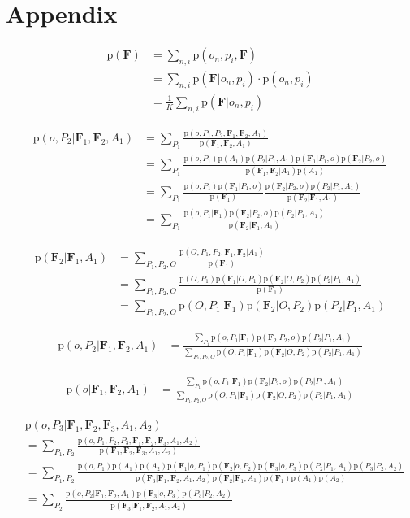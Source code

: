 \documentclass[11pt]{article}
\newcommand{\SetOf}[1]{\mathbf{#1}} %
\newcommand{\prob}[1]{\text{p}(#1)} %
\newcommand{\Eq}[1]{\begin{align*}#1\end{align*}} %
\begin{document}
	

\section{Appendix}
	\Eq{\prob{\SetOf{F}} &= \sum_{n,i} \prob{o_n,p_i,\SetOf{F}}\\
	&= \sum_{n,i} \prob{\SetOf{F}|o_n,p_i}\cdot \prob{o_n,p_i}\\
	&= \frac{1}{K} \sum_{n,i} \prob{\SetOf{F}|o_n,p_i}}

	\Eq{\prob{o,P_2|\SetOf{F}_1,\SetOf{F}_2,A_1} &= \sum_{P_1} \frac{\prob{o,P_1,P_2,\SetOf{F}_1,\SetOf{F}_2,A_1}}{\prob{\SetOf{F}_1,\SetOf{F}_2,A_1}} \\
	&= \sum_{P_1} \frac{\prob{o,P_1}\prob{A_1}\prob{P_2|P_1,A_1}\prob{\SetOf{F}_1|P_1,o} \prob{\SetOf{F}_2|P_2,o}}{\prob{\SetOf{F}_1,\SetOf{F}_2|A_1}\prob{A_1}} \\
	&= \sum_{P_1} \frac{\prob{o,P_1}\prob{\SetOf{F}_1|P_1,o}}{ \prob{\SetOf{F}_1}} \frac{\prob{\SetOf{F}_2|P_2,o}\prob{P_2|P_1,A_1}}{\prob{\SetOf{F}_2|\SetOf{F}_1,A_1}} \\
	&= \sum_{P_1} \frac{ \prob{o,P_1|\SetOf{F}_1} \prob{\SetOf{F}_2|P_2,o} \prob{P_2|P_1,A_1} }{ \prob{\SetOf{F}_2|\SetOf{F}_1,A_1}} }

	\Eq{\prob{\SetOf{F}_2|\SetOf{F}_1,A_1} &= \sum_{P_1,P_2, O} \frac{\prob{O,P_1, P_2, \SetOf{F}_1, \SetOf{F}_2| A_1}}{\prob{\SetOf{F}_1}} \\ 
	&= \sum_{P_1,P_2, O} \frac{\prob{O,P_1}  \prob{\SetOf{F}_1|O,P_1} \prob{\SetOf{F}_2|O,P_2} \prob{P_2|P_1,A_1}}{\prob{\SetOf{F}_1}} \\ 
	&= \sum_{P_1,P_2, O} \prob{O,P_1|\SetOf{F}_1} \prob{\SetOf{F}_2|O,P_2} \prob{P_2|P_1,A_1}}

	\Eq{\prob{o,P_2|\SetOf{F}_1,\SetOf{F}_2,A_1} &=  \frac{ \sum_{P_1} \prob{o,P_1|\SetOf{F}_1} \prob{\SetOf{F}_2|P_2,o} \prob{P_2|P_1,A_1} }{ \sum_{P_1,P_2, O} \prob{O,P_1|\SetOf{F}_1} \prob{\SetOf{F}_2|O,P_2} \prob{P_2|P_1,A_1}} }

	\Eq{\prob{o|\SetOf{F}_1,\SetOf{F}_2,A_1} &=  \frac{ \sum_{P_1} \prob{o,P_1|\SetOf{F}_1} \prob{\SetOf{F}_2|P_2,o} \prob{P_2|P_1,A_1} }{ \sum_{P_1,P_2, O} \prob{O,P_1|\SetOf{F}_1} \prob{\SetOf{F}_2|O,P_2} \prob{P_2|P_1,A_1}} }

	\Eq{&\prob{o,P_3|\SetOf{F}_1,\SetOf{F}_2,\SetOf{F}_3,A_1,A_2} \\ 
	&= \sum_{P_1,P_2} \frac{\prob{o,P_1,P_2,P_3,\SetOf{F}_1,\SetOf{F}_2,\SetOf{F}_3,A_1,A_2}}{\prob{\SetOf{F}_1,\SetOf{F}_2,\SetOf{F}_3,A_1,A_2}} \\
	&= \sum_{P_1,P_2} \frac{\prob{o,P_1}\prob{A_1}\prob{A_2}\prob{\SetOf{F}_1|o,P_1}\prob{\SetOf{F}_2|o,P_2}\prob{\SetOf{F}_3|o,P_3}\prob{P_2|P_1,A_1}\prob{P_3|P_2,A_2}}{\prob{\SetOf{F}_3|\SetOf{F}_1,\SetOf{F}_2,A_1,A_2} \prob{\SetOf{F}_2|\SetOf{F}_1,A_1} \prob{\SetOf{F}_1} \prob{A_1} \prob{A_2} } \\
	&= \sum_{P_2} \frac{ \prob{o,P_2|\SetOf{F}_1,\SetOf{F}_2,A_1} \prob{\SetOf{F}_3|o,P_3} \prob{P_3|P_2,A_2}}{\prob{\SetOf{F}_3|\SetOf{F}_1,\SetOf{F}_2,A_1,A_2}} }
\end{document}
